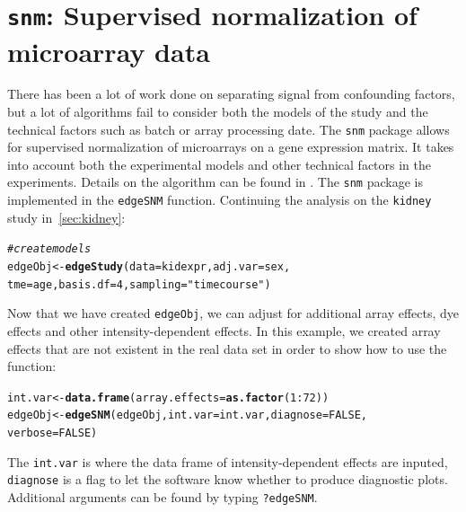 \documentclass{article}\usepackage[]{graphicx}\usepackage[]{color}
\makeatletter
\newcommand{\hlnum}[1]{\textcolor[rgb]{0.686,0.059,0.569}{#1}}%
\newcommand{\hlstr}[1]{\textcolor[rgb]{0.192,0.494,0.8}{#1}}%
\newcommand{\hlcom}[1]{\textcolor[rgb]{0.678,0.584,0.686}{\textit{#1}}}%
\newcommand{\hlopt}[1]{\textcolor[rgb]{0,0,0}{#1}}%
\newcommand{\hlstd}[1]{\textcolor[rgb]{0.345,0.345,0.345}{#1}}%
\newcommand{\hlkwb}[1]{\textcolor[rgb]{0.69,0.353,0.396}{#1}}%
\newcommand{\hlkwc}[1]{\textcolor[rgb]{0.333,0.667,0.333}{#1}}%
\newcommand{\hlkwd}[1]{\textcolor[rgb]{0.737,0.353,0.396}{\textbf{#1}}}%
\newenvironment{kframe}{%
 \def\at@end@of@kframe{}%
 \ifinner\ifhmode%
  \def\at@end@of@kframe{\end{minipage}}%
  \begin{minipage}{\columnwidth}%
 \fi\fi%
 \def\FrameCommand##1{\hskip\@totalleftmargin \hskip-\fboxsep
 \colorbox{shadecolor}{##1}\hskip-\fboxsep
     \hskip-\linewidth \hskip-\@totalleftmargin \hskip\columnwidth}%
 \MakeFramed {\advance\hsize-\width
   \@totalleftmargin\z@ \linewidth\hsize
   \@setminipage}}%
 {\par\unskip\endMakeFramed%
 \at@end@of@kframe}
\newenvironment{knitrout}{}{} %
\makeatother
\begin{document}
\section{{\tt snm}: Supervised normalization of microarray data}
There has been a lot of work done on separating signal from confounding factors, but a lot of algorithms fail to consider both the models of the study and the technical factors such as batch or array processing date. The {\tt snm} package allows for supervised normalization of microarrays on a gene expression matrix. It takes into account both the experimental models and other technical factors in the experiments. Details on the algorithm can be found in \cite{mecham:2010}. The {\tt snm} package is implemented in the {\tt edgeSNM} function. Continuing the analysis on the {\tt kidney} study in~\ref{sec:kidney}:
\begin{knitrout}
\color{fgcolor}\begin{kframe}
\begin{alltt}
\hlcom{# create models}
\hlstd{edgeObj} \hlkwb{<-} \hlkwd{edgeStudy}\hlstd{(}\hlkwc{data} \hlstd{= kidexpr,} \hlkwc{adj.var} \hlstd{= sex,}
    \hlkwc{tme} \hlstd{= age,} \hlkwc{basis.df} \hlstd{=} \hlnum{4}\hlstd{,} \hlkwc{sampling} \hlstd{=} \hlstr{"timecourse"}\hlstd{)}
\end{alltt}
\end{kframe}
\end{knitrout}
Now that we have created {\tt edgeObj}, we can adjust for additional array effects, dye effects and other intensity-dependent effects.  In this example, we created array effects that are not existent in the real data set in order to show how to use the function:
\begin{knitrout}
\color{fgcolor}\begin{kframe}
\begin{alltt}
\hlstd{int.var} \hlkwb{<-} \hlkwd{data.frame}\hlstd{(}\hlkwc{array.effects} \hlstd{=} \hlkwd{as.factor}\hlstd{(}\hlnum{1}\hlopt{:}\hlnum{72}\hlstd{))}
\hlstd{edgeObj} \hlkwb{<-} \hlkwd{edgeSNM}\hlstd{(edgeObj,} \hlkwc{int.var} \hlstd{= int.var,} \hlkwc{diagnose} \hlstd{=} \hlnum{FALSE}\hlstd{,}
    \hlkwc{verbose} \hlstd{=} \hlnum{FALSE}\hlstd{)}
\end{alltt}
\end{kframe}
\end{knitrout}
The {\tt int.var} is where the data frame of intensity-dependent effects are inputed, {\tt diagnose} is a flag to let the software know whether to produce diagnostic plots. Additional arguments can be found by typing {\tt ?edgeSNM}.
\end{document}
